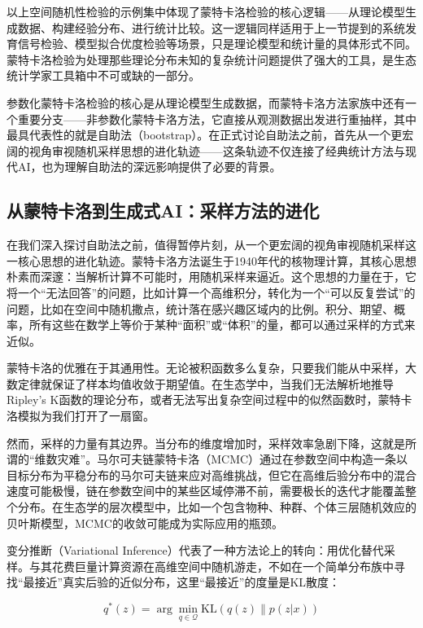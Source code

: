 \documentclass[
  twoside,12pt,fontset=none]{ctexbook}
\begin{document}
以上空间随机性检验的示例集中体现了蒙特卡洛检验的核心逻辑------从理论模型生成数据、构建经验分布、进行统计比较。这一逻辑同样适用于上一节提到的系统发育信号检验、模型拟合优度检验等场景，只是理论模型和统计量的具体形式不同。蒙特卡洛检验为处理那些理论分布未知的复杂统计问题提供了强大的工具，是生态统计学家工具箱中不可或缺的一部分。

参数化蒙特卡洛检验的核心是从理论模型生成数据，而蒙特卡洛方法家族中还有一个重要分支------非参数化蒙特卡洛方法，它直接从观测数据出发进行重抽样，其中最具代表性的就是自助法（bootstrap）。在正式讨论自助法之前，首先从一个更宏阔的视角审视随机采样思想的进化轨迹------这条轨迹不仅连接了经典统计方法与现代AI，也为理解自助法的深远影响提供了必要的背景。

\hypertarget{ch07-monte-carlo-to-genai}{%
\subsection{从蒙特卡洛到生成式AI：采样方法的进化}\label{ch07-monte-carlo-to-genai}}

在我们深入探讨自助法之前，值得暂停片刻，从一个更宏阔的视角审视随机采样这一核心思想的进化轨迹。蒙特卡洛方法诞生于1940年代的核物理计算，其核心思想朴素而深邃：当解析计算不可能时，用随机采样来逼近。这个思想的力量在于，它将一个``无法回答''的问题，比如计算一个高维积分，转化为一个``可以反复尝试''的问题，比如在空间中随机撒点，统计落在感兴趣区域内的比例。积分、期望、概率，所有这些在数学上等价于某种``面积''或``体积''的量，都可以通过采样的方式来近似。

蒙特卡洛的优雅在于其通用性。无论被积函数多么复杂，只要我们能从中采样，大数定律就保证了样本均值收敛于期望值。在生态学中，当我们无法解析地推导Ripley's K函数的理论分布，或者无法写出复杂空间过程中的似然函数时，蒙特卡洛模拟为我们打开了一扇窗。

然而，采样的力量有其边界。当分布的维度增加时，采样效率急剧下降，这就是所谓的``维数灾难''。马尔可夫链蒙特卡洛（MCMC）通过在参数空间中构造一条以目标分布为平稳分布的马尔可夫链来应对高维挑战，但它在高维后验分布中的混合速度可能极慢，链在参数空间中的某些区域停滞不前，需要极长的迭代才能覆盖整个分布。在生态学的层次模型中，比如一个包含物种、种群、个体三层随机效应的贝叶斯模型，MCMC的收敛可能成为实际应用的瓶颈。

变分推断（Variational Inference）代表了一种方法论上的转向：用优化替代采样。与其花费巨量计算资源在高维空间中随机游走，不如在一个简单分布族中寻找``最接近''真实后验的近似分布，这里``最接近''的度量是KL散度：

\[q^*(z) = \arg\min_{q \in \mathcal{Q}} \text{KL}(q(z) \| p(z|x))\]
\end{document}
